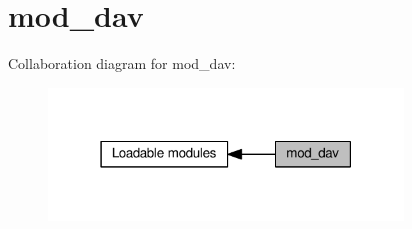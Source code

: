 \hypertarget{group__MOD__DAV}{}\section{mod\+\_\+dav}
\label{group__MOD__DAV}
Collaboration diagram for mod\+\_\+dav\+:
\nopagebreak
\begin{figure}[H]
\begin{center}
\leavevmode
\includegraphics[width=267pt]{group__MOD__DAV}
\end{center}
\end{figure}
